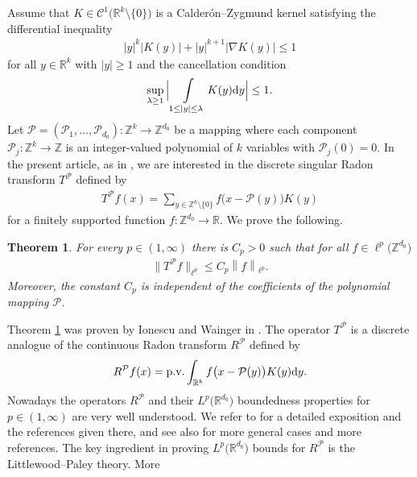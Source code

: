 \documentclass[a4paper,oneside]{amsart}
\theoremstyle{plain}
\theoremstyle{definition}
\numberwithin{equation}{section}
\newcounter{thm}
\theoremstyle{plain}
\newtheorem{main_theorem}[thm]{Theorem}
\newcommand{\RR}{\mathbb{R}}
\newcommand{\ZZ}{\mathbb{Z}}
\newcommand{\calC}{\mathcal{C}}
\newcommand{\calP}{\mathcal{P}}
\newcommand{\norm}[1]{{\left\lvert #1 \right\rvert}}
\newcommand{\abs}[1]{{\lvert {#1} \rvert}}
\newcommand{\vnorm}[1]{{\left\lVert {#1} \right\rVert}}
\newcommand{\8}{\infty}
\begin{document}
\label{sec:1}
Assume that $K \in \calC^1\big(\RR^k \setminus \{0\}\big)$ is a Calder\'{o}n--Zygmund kernel
satisfying the differential inequality
\begin{align}
	\label{eq:3}
	\norm{y}^k \abs{K(y)} + \norm{y}^{k+1} \norm{\nabla K(y)} \leq 1
\end{align}
for all $y \in \RR^k$ with $\norm{y} \geq 1$ and the cancellation condition
\begin{align}
	\label{eq:4}
	\sup_{\lambda \geq 1}
	\Big\lvert
	\int\limits_{1 \leq \norm{y} \leq \lambda} K(y) {\rm d} y
	\Big\rvert
	\leq 1.
\end{align}
Let $\calP=(\calP_1,\ldots, \calP_{d_0}): \ZZ^{k} \rightarrow \ZZ^{d_0}$ be a mapping where 
each component $\calP_j:\ZZ^{k} \rightarrow \ZZ$ is
an integer-valued polynomial of $k$ variables with $\calP_j(0) =
0$. In the present article, as in \cite{iw}, we
are interested in the discrete  singular Radon transform $T^{\calP}$
defined  by 
\begin{align}
  \label{eq:31}
T^{\calP} f(x)
=
\sum_{y\in\ZZ^k\setminus\{0\}} f\big(x - \calP(y)\big) K(y)  
\end{align}
for a finitely
supported function $f: \ZZ^{d_0} \rightarrow \RR$.
We prove the following.
\begin{main_theorem}
	\label{thm:0}
        For every $p \in (1, \infty)$ there is $C_p > 0$ such that for all
		$f \in \ell^p\big(\ZZ^{d_0}\big)$
                \begin{align}
                  \label{eq:35}
		\big\lVert
		T^\calP f 
		\big\rVert_{\ell^p}
		\leq
		C_p \vnorm{f}_{\ell^p}.
                \end{align}
		Moreover, the constant $C_p$ is independent of the coefficients of the polynomial mapping 
		$\calP$.
\end{main_theorem}
Theorem \ref{thm:0} was proven by Ionescu and Wainger in \cite{iw}. 
The operator $T^{\calP}$ is a discrete analogue of the continuous
Radon transform $R^{\calP}$ defined by
\begin{align}
  \label{eq:36}
R^{\calP}f(x)
={\rm p.v.}\int_{\RR^k} f\big(x - \calP(y)\big) K(y){\rm d}y.  
\end{align}
Nowadays the operators $R^{\calP}$ and their $L^p\big(\RR^{d_0}\big)$
boundedness properties for $p\in(1, \infty)$ are very well understood. We refer to
\cite{bigs} for a detailed exposition and the references given there,
and see also \cite{cnsw} for more general cases and more
references. The key ingredient in proving $L^p\big(\RR^{d_0}\big)$
bounds for $R^{\calP}$ is the Littlewood--Paley theory. More
\end{document}
